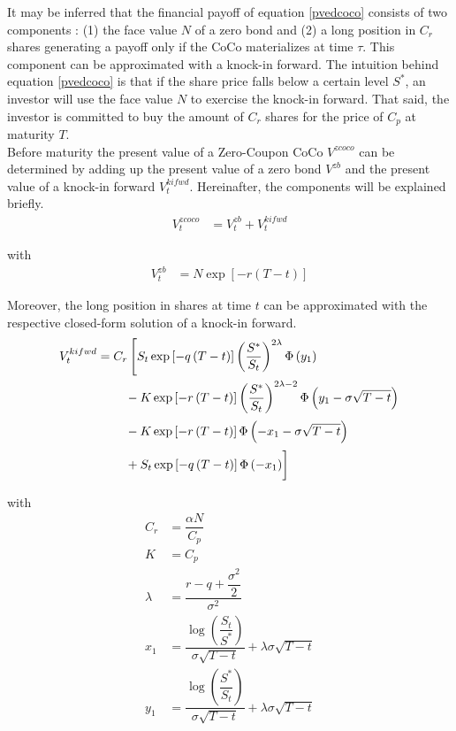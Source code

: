 It may be inferred that the financial payoff of equation \ref{pvedcoco} consists of two components \citep{erismann2015pricing}: (1) the face value $N$ of a zero bond and (2) a long position in $C_r$ shares generating a payoff only if the CoCo materializes at time $\tau$. This component can be approximated with a knock-in forward. The intuition behind equation \ref{pvedcoco} is that if the share price falls below a certain level $S^*$, an investor will use the face value $N$ to exercise the knock-in forward. That said, the investor is committed to buy the amount of $C_r$ shares for the price of $C_p$ at maturity $T$.\\

Before maturity the present value of a Zero-Coupon CoCo $V^{zcoco}$ can be determined by adding up the present value of a zero bond $V^{zb}$ and the present value of a knock-in forward $V_t^{kifwd}$. Hereinafter, the components will be explained briefly. 
\begin{align} \label{pvzcoco}
V^{zcoco}_t &= V^{zb}_t + V_t^{kifwd}
\end{align}

with
\begin{align} 
V^{zb}_t &= N \exp\left[- r (T - t)\right]
\end{align}

Moreover, the long position in shares at time $t$ can be approximated with the respective closed-form solution of a knock-in forward. \citep{hull2006options} 
\begin{align}
    V_t^{kifwd} &= C_r \left[ S_t \exp\left[- q \left(T-t\right)\right]\left(\dfrac{S^*}{S_t}\right)^{2 \lambda} \Phi\left(y_1\right) \right.\nonumber\\
   &\qquad \left.\vphantom{\dfrac{S^*}{S_t}} - K \exp\left[- r \left(T-t\right)\right] \left(\dfrac{S^*}{S_t}\right)^{2 \lambda - 2} \Phi\left(y_1 - \sigma \sqrt{T-t}\right) \right.\nonumber\\
   &\qquad \left.\vphantom{\dfrac{S^*}{S_t}} - K \exp\left[- r \left(T-t\right)\right] \Phi\left(-x_1 - \sigma \sqrt{T-t}\right) \right.\nonumber\\
   &\qquad \left.\vphantom{\dfrac{S^*}{S_t}} + S_t \exp\left[- q \left(T-t\right)\right] \Phi\left(- x_1\right) \right] 
\end{align}

with 
\begin{align*}
C_r &= \dfrac{\alpha N}{C_p}\\
K &= C_p\\
\lambda &= \dfrac{r-q+\dfrac{\sigma^2}{2}}{\sigma^2}\\
x_1 &= \dfrac{\log\left(\dfrac{S_t}{S^*} \right)}{\sigma \sqrt{T-t}} + \lambda \sigma \sqrt{T-t}\\
y_1 &= \dfrac{\log\left(\dfrac{S^*}{S_t} \right)}{\sigma \sqrt{T-t}} + \lambda \sigma \sqrt{T-t}\\
\end{align*}



